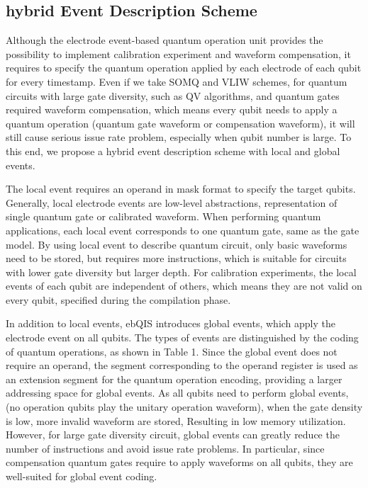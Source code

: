 \subsection{hybrid Event Description Scheme }
Although the electrode event-based quantum operation unit provides the possibility to implement calibration experiment and waveform compensation, 
it requires to specify the quantum operation applied by each electrode of each qubit for every timestamp. 
Even if we take SOMQ and VLIW schemes, for quantum circuits with large gate diversity, 
such as QV algorithms, and quantum gates required waveform compensation, 
which means every qubit needs to apply a quantum operation (quantum gate waveform or compensation waveform), 
it will still cause serious issue rate problem, especially when qubit number is large. 
To this end, we propose a hybrid event description scheme with local and global events.

The local event requires an operand in mask format to specify the target qubits. Generally, local electrode events are low-level abstractions, 
representation of single quantum gate or calibrated waveform. 
When performing quantum applications, each local event corresponds to one quantum gate, same as the gate model.
By using local event to describe quantum circuit, only basic waveforms need to be stored, but requires more instructions, which is suitable for circuits with lower gate diversity but larger depth. 
For calibration experiments, the local events of each qubit are independent of others, which means they are not valid on every qubit, specified during the compilation phase.

In addition to local events, ebQIS introduces global events, which apply the electrode event on all qubits. 
The types of events are distinguished by the coding of quantum operations, as shown in Table 1. 
Since the global event does not require an operand, the segment corresponding to the operand register is used as an extension segment for the quantum operation encoding, 
providing a larger addressing space for global events.
As all qubits need to perform global events, (no operation qubits play the unitary operation waveform), 
when the gate density is low, more invalid waveform are stored, Resulting in low memory utilization. 
However, for large gate diversity circuit, global events can greatly reduce the number of instructions and avoid issue rate problems. 
In particular, since compensation quantum gates require to apply waveforms on all qubits, they are well-suited for global event coding.

